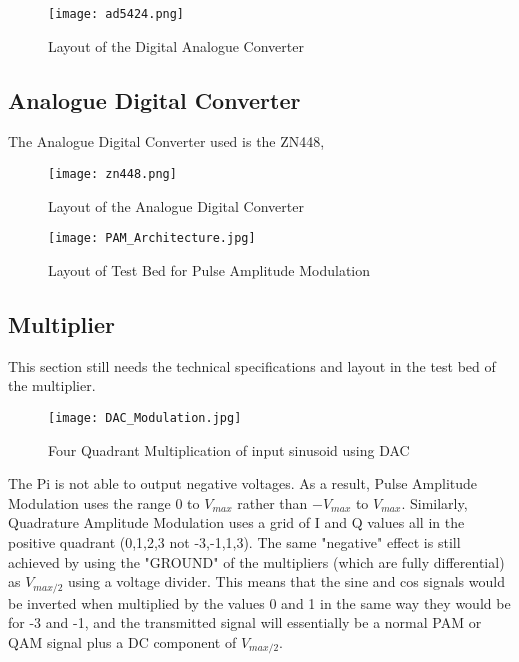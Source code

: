 \documentclass[../main.tex]{subfiles}
\begin{document}
\begin{figure}[ht]
	\centering
	\texttt{[image: ad5424.png]}
	\caption{Layout of the Digital Analogue Converter}
	\label{fig_DAC Layout}
\end{figure}

\subsection{Analogue Digital Converter}

The Analogue Digital Converter used is the ZN448, 

\begin{figure}[ht]
	\centering
	\texttt{[image: zn448.png]}
	\caption{Layout of the Analogue Digital Converter}
	\label{fig_ADC Layout}
\end{figure}

\begin{figure}[ht]
	\centering
	\texttt{[image: PAM\_Architecture.jpg]}
	\caption{Layout of Test Bed for Pulse Amplitude Modulation}
\end{figure}

\subsection{Multiplier} \label{sec_Multiplier}

This section still needs the technical specifications and layout in the test bed of the multiplier.


\begin{figure}[ht]
	\centering
	\texttt{[image: DAC\_Modulation.jpg]}
	\caption{Four Quadrant Multiplication of input sinusoid using DAC}
	\label{fig_}
\end{figure}

The Pi is not able to output negative voltages.
As a result, Pulse Amplitude Modulation uses the range $0$ to $V_{max}$ rather than $-V_{max}$ to $V_{max}$.
Similarly, Quadrature Amplitude Modulation uses a grid of I and Q values all in the positive quadrant (0,1,2,3 not -3,-1,1,3).
The same "negative" effect is still achieved by using the "GROUND" of the multipliers (which are fully differential)
as $V_{max/2}$ using a voltage divider.
This means that the sine and cos signals would be inverted when multiplied by the values 0 and 1 in the same way they would be for -3 and -1, and the transmitted signal will essentially be a normal PAM or QAM signal plus a DC component of $V_{max/2}$.
\end{document}
